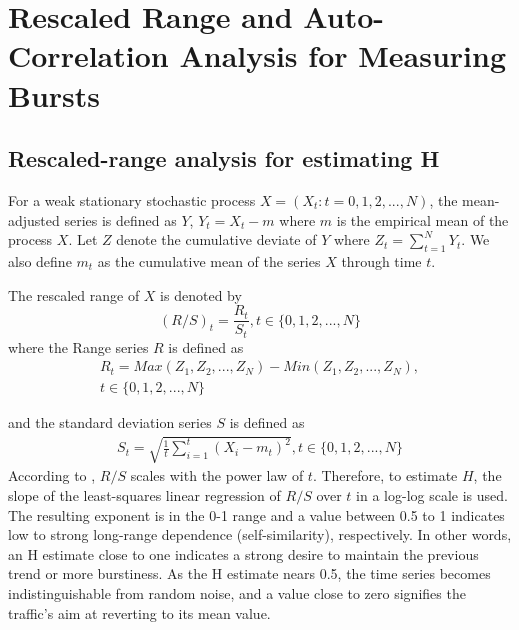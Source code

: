 \appendix 
\makeatletter
{}
\makeatother
\renewcommand{\thechapter}{\Alph{chapter}}

\chapter{Rescaled Range and Auto-Correlation Analysis for Measuring Bursts} \label{chap:appendix-valinor}


\section{Rescaled-range analysis for estimating H}
\label{app:rs}
For a weak stationary stochastic process $X = (X_t : t = 0, 1, 2, ..., N )$, the mean-adjusted series is defined as $Y$, $Y_t = X_t - m$ where $m$ is the empirical mean of the process $X$.
Let $Z$ denote the cumulative deviate of $Y$ where $Z_t = \sum_{t=1}^{N} Y_t$. We also define $m_t$ as the cumulative mean of the series $X$ through time $t$.

The rescaled range of $X$ is denoted by
\begin{equation}
    (R/S)_t = \frac{R_t}{S_t}, t \in \{0, 1, 2, ..., N\}
\end{equation}
where the Range series $R$ is defined as
\begin{equation}
\begin{split}
    R_t = Max(Z_1, Z_2, ..., Z_N) - Min(Z_1, Z_2, ..., Z_N), \\
    t \in \{0, 1, 2, ..., N\}
\end{split}
\end{equation}

and the standard deviation series $S$ is defined as
\begin{equation}
\begin{split}
    S_t = \sqrt{\frac{1}{t} \sum_{i = 1}^{t} (X_i - m_t)^2 },
    t \in \{0, 1, 2, ..., N\}
\end{split}
\end{equation}
According to \cite{hurst}, $R/S$ scales with the power law of $t$. Therefore, to estimate $H$, the slope of the least-squares linear regression of $R/S$ over $t$ in a log-log scale is used.
The resulting exponent is in the 0-1 range and a value between 0.5 to 1 indicates low to strong long-range dependence (self-similarity), respectively. 
In other words, an H estimate close to one indicates a strong desire to maintain the previous trend or more burstiness. As the H estimate nears 0.5, the time series becomes indistinguishable from random noise, and a value close to zero signifies the traffic's aim at reverting to its mean value.

